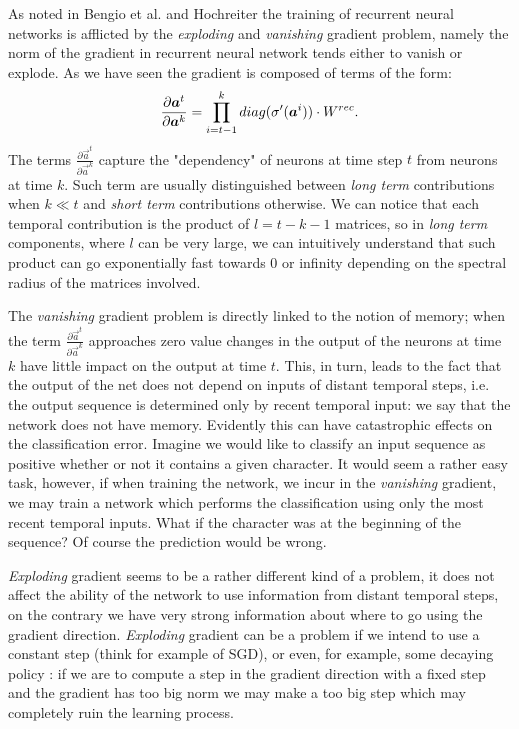 As noted in Bengio et al.\cite{learningIsDifficult} and Hochreiter\cite{lstm}
the training of recurrent neural networks is afflicted by the \textit{exploding} and \textit{vanishing} gradient problem, namely the norm of the gradient in recurrent neural network tends either to vanish or explode.
As we have seen the gradient is composed of terms of the form:
\begin{equation}
\frac{\partial \boldsymbol{a}^t}{\partial \boldsymbol{a}^k} = \prod_{i=t-1}^{k}  diag(\sigma'(\boldsymbol{a}^i)) \cdot W^{rec}.
\label{eq:temporalComponent}
\end{equation}
The terms $\frac{\partial \vec{a}^t}{\partial \vec{a}^k}$ capture the "dependency" of neurons at time step $t$ from neurons at time $k$.
Such term are usually distinguished between \textit{long term} contributions when $k\ll t$ and \textit{short term} contributions otherwise. We can notice that each temporal contribution is the product of $l=t-k-1$ matrices, so in \textit{long term} components, where $l$ can be very large, we can intuitively understand that such product can go exponentially fast towards 0 or infinity depending on the spectral radius of the matrices involved.

The \textit{vanishing} gradient problem is directly linked to the notion of memory; when the term $\frac{\partial \vec{a}^t}{\partial \vec{a}^k}$ approaches zero value changes in the output of the neurons at time $k$ have little impact on the output at time $t$. This, in turn, leads to the fact that the output of the net does not depend on inputs of distant temporal steps, i.e. the output
sequence is determined only by recent temporal input: we say that the network does not have memory. Evidently this can have catastrophic effects on the classification error. Imagine we would like
to classify an input sequence as positive whether or not it contains a given character. It would seem a rather easy task, however, if when training the network, we incur in the \textit{vanishing} gradient, we may train a network which performs the classification using only the most recent temporal inputs. What if the character was at the beginning of the sequence? Of course the prediction would be wrong.

\textit{Exploding} gradient seems to be a rather different kind of a problem, it does not affect the ability of the network to use information from distant temporal steps, on the contrary we have very strong information about where to go using the gradient direction. 
\textit{Exploding} gradient can be a problem if we intend to use a constant step (think for example of SGD), or even, for example, some decaying policy : if we are to compute a step in the gradient direction with a fixed step and the gradient has too big norm we may make a too big step which may completely ruin the learning process.

